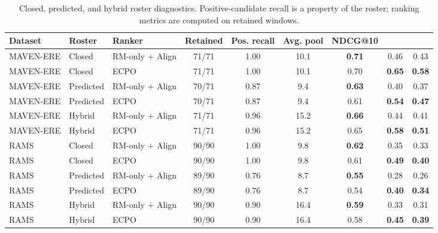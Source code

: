 \documentclass{article}
\begin{document}
\begin{table}[h]
\centering
\caption{Closed, predicted, and hybrid roster diagnostics. Positive-candidate recall is a property of the roster; ranking metrics are computed on retained windows.}
\label{tab:roster_diagnostics}
\small
\begin{adjustbox}{max width=\linewidth}
\begin{tabular}{l l l c c c c c c}
\toprule
Dataset & Roster & Ranker & Retained & Pos. recall & Avg. pool & NDCG@10 & \EvidCons@10 & \CertNDCG@10 \\
\midrule
MAVEN-ERE & Closed & RM-only + Align & 71/71 & 1.00 & 10.1 & \textbf{0.71} & 0.46 & 0.43 \\
MAVEN-ERE & Closed & ECPO & 71/71 & 1.00 & 10.1 & 0.70 & \textbf{0.65} & \textbf{0.58} \\
MAVEN-ERE & Predicted & RM-only + Align & 70/71 & 0.87 & 9.4 & \textbf{0.63} & 0.40 & 0.37 \\
MAVEN-ERE & Predicted & ECPO & 70/71 & 0.87 & 9.4 & 0.61 & \textbf{0.54} & \textbf{0.47} \\
MAVEN-ERE & Hybrid & RM-only + Align & 71/71 & 0.96 & 15.2 & \textbf{0.66} & 0.44 & 0.41 \\
MAVEN-ERE & Hybrid & ECPO & 71/71 & 0.96 & 15.2 & 0.65 & \textbf{0.58} & \textbf{0.51} \\
\midrule
RAMS & Closed & RM-only + Align & 90/90 & 1.00 & 9.8 & \textbf{0.62} & 0.35 & 0.33 \\
RAMS & Closed & ECPO & 90/90 & 1.00 & 9.8 & 0.61 & \textbf{0.49} & \textbf{0.40} \\
RAMS & Predicted & RM-only + Align & 89/90 & 0.76 & 8.7 & \textbf{0.55} & 0.28 & 0.26 \\
RAMS & Predicted & ECPO & 89/90 & 0.76 & 8.7 & 0.54 & \textbf{0.40} & \textbf{0.34} \\
RAMS & Hybrid & RM-only + Align & 90/90 & 0.90 & 16.4 & \textbf{0.59} & 0.33 & 0.31 \\
RAMS & Hybrid & ECPO & 90/90 & 0.90 & 16.4 & 0.58 & \textbf{0.45} & \textbf{0.39} \\
\bottomrule
\end{tabular}
\end{adjustbox}
\end{table}
\end{document}
